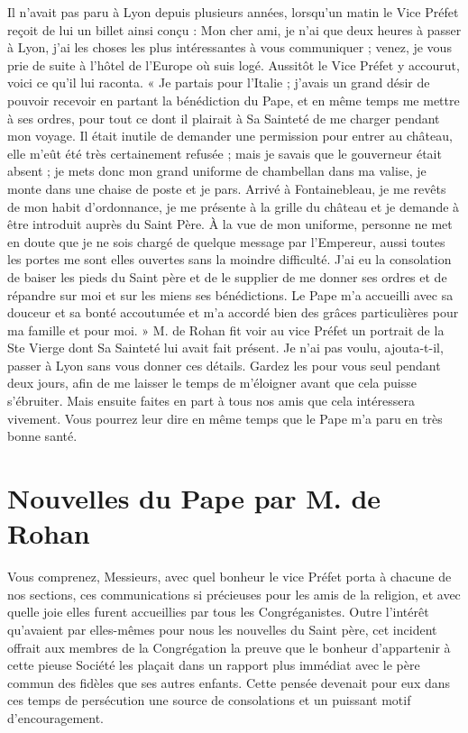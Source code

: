 Il n'avait pas paru à Lyon depuis plusieurs années, lorsqu'un matin le Vice Préfet reçoit de lui un billet ainsi conçu : Mon cher ami, je n'ai que deux heures à passer à Lyon, j'ai les choses les plus intéressantes à vous communiquer ; venez, je vous prie de suite à l'hôtel de l'Europe où suis logé. Aussitôt le Vice Préfet y accourut, voici ce qu'il lui raconta. « Je partais pour l'Italie ; j'avais un grand désir de pouvoir recevoir en partant la bénédiction du Pape, et en même temps me mettre à ses ordres, pour tout ce dont il plairait à Sa Sainteté de me charger pendant mon voyage. Il était inutile de demander une permission pour entrer au château, elle m'eût été très certainement refusée ; mais je savais que le gouverneur était absent ; je mets donc mon grand uniforme de chambellan dans ma valise, je monte dans une chaise de poste et je pars. Arrivé à Fontainebleau, je me revêts de mon habit d'ordonnance, je me présente à la grille du château et je demande à être introduit auprès du Saint Père. À la vue de mon uniforme, personne ne met en doute que je ne sois chargé de quelque message par l'Empereur,
aussi toutes les portes me sont elles ouvertes sans la moindre difficulté. J'ai eu la consolation de baiser les pieds du Saint père et de le supplier de me donner ses ordres et de répandre sur moi et sur les miens ses bénédictions. Le Pape m'a accueilli avec sa douceur et sa bonté accoutumée et m'a accordé bien des grâces particulières pour ma famille et pour moi. » M. de Rohan fit voir au vice Préfet un portrait de la Ste Vierge dont Sa Sainteté lui avait fait présent. Je n'ai pas voulu, ajouta-t-il, passer à Lyon sans vous donner ces détails. Gardez les pour vous seul pendant deux jours, afin de me laisser le temps de m'éloigner avant que cela puisse s'ébruiter. Mais ensuite faites en part à tous nos amis que cela intéressera vivement. Vous pourrez leur dire en même temps que le Pape m'a paru en très bonne santé.

\section*{Nouvelles du Pape par M. de Rohan}
Vous comprenez, Messieurs, avec quel bonheur le vice Préfet porta à chacune de nos sections, ces communications si précieuses pour les amis de la religion, et avec quelle joie elles furent accueillies par tous les Congréganistes. Outre l'intérêt qu'avaient par elles-mêmes pour nous les nouvelles du Saint père, cet incident offrait aux membres de la Congrégation la preuve que le bonheur d'appartenir à cette pieuse Société les plaçait dans un rapport plus immédiat avec le père commun des fidèles que ses autres enfants. Cette pensée devenait pour eux dans ces temps de persécution une source de consolations et un puissant motif d'encouragement.

